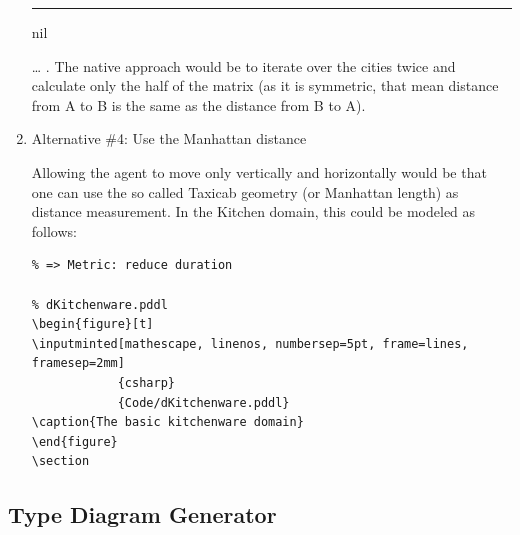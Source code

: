 \documentclass[11pt]{article}
\begin{document}
\begin{enumerate}
\begin{center}
{\begin{minipage}[c]{.6\textwidth}
\rule[.8em]{\textwidth}{2pt}

nil\end{minipage}
}
\end{center}
\ldots{} . The native approach would be to iterate over the cities twice
and calculate only the half of the matrix (as it is symmetric, that
mean distance from A to B is the same as the distance from B to A).

\item Alternative \#4: Use the Manhattan distance
\label{sec-4-3-3-4}

Allowing the agent to move only vertically and horizontally would be
that one can use the so called Taxicab geometry (or Manhattan length)
as distance measurement.  In the Kitchen domain, this could be modeled
as follows:

\begin{verbatim}
% => Metric: reduce duration

% dKitchenware.pddl 
\begin{figure}[t]
\inputminted[mathescape, linenos, numbersep=5pt, frame=lines, framesep=2mm]
            {csharp}
            {Code/dKitchenware.pddl}
\caption{The basic kitchenware domain}
\end{figure}
\section
\end{verbatim}

\begin{center}
\end{center}
\end{enumerate}
\subsection{Type Diagram Generator}
\label{sec-4-4}
\begin{center}
\end{center}
\end{document}
